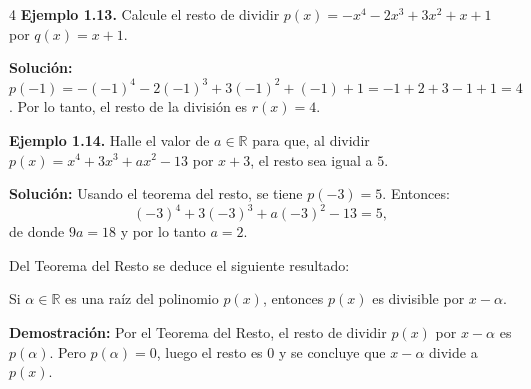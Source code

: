 \documentclass[landscape]{article}
\begin{document}
\begin{landscape}
\begin{multicols}{4}
\noindent\textbf{Ejemplo 1.13.} Calcule el resto de dividir $p(x) = -x^4 - 2x^3 + 3x^2 + x + 1$ por $q(x) = x + 1$.

\noindent\textbf{Solución:}
$p(-1) = -(-1)^4 - 2(-1)^3 + 3(-1)^2 + (-1) + 1 = -1 + 2 + 3 - 1 + 1 = 4$.
Por lo tanto, el resto de la división es $r(x) = 4$.

\noindent\textbf{Ejemplo 1.14.} Halle el valor de $a \in \mathbb{R}$ para que, al dividir $p(x) = x^4 + 3x^3 + ax^2 - 13$ por $x + 3$, el resto sea igual a $5$.

\noindent\textbf{Solución:}
Usando el teorema del resto, se tiene $p(-3) = 5$. Entonces:
\[
(-3)^4 + 3(-3)^3 + a(-3)^2 - 13 = 5,
\]
de donde $9a = 18$ y por lo tanto $a = 2$.

Del Teorema del Resto se deduce el siguiente resultado:

\begin{tcolorbox}[colback=red!5!white,colframe=red!75!black,title=\textbf{Teorema}]
Si $\alpha \in \mathbb{R}$ es una raíz del polinomio $p(x)$, entonces $p(x)$ es divisible por $x - \alpha$.

\medskip\noindent\textbf{Demostración:}
Por el Teorema del Resto, el resto de dividir $p(x)$ por $x - \alpha$ es $p(\alpha)$. Pero $p(\alpha) = 0$, luego el resto es 0 y se concluye que $x - \alpha$ divide a $p(x)$.
\end{tcolorbox}


\columnbreak


\end{multicols}
\end{landscape}
\end{document}
